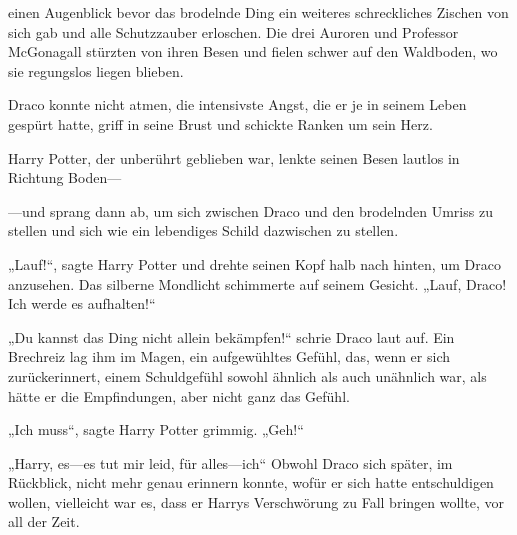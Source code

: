 \begin{em}
einen Augenblick bevor das brodelnde Ding ein weiteres schreckliches Zischen von sich gab und alle Schutzzauber erloschen. Die drei Auroren und Professor McGonagall stürzten von ihren Besen und fielen schwer auf den Waldboden, wo sie regungslos liegen blieben.

Draco konnte nicht atmen, die intensivste Angst, die er je in seinem Leben gespürt hatte, griff in seine Brust und schickte Ranken um sein Herz.

Harry Potter, der unberührt geblieben war, lenkte seinen Besen lautlos in Richtung Boden—

—und sprang dann ab, um sich zwischen Draco und den brodelnden Umriss zu stellen und sich wie ein lebendiges Schild dazwischen zu stellen.

„Lauf!“, sagte Harry Potter und drehte seinen Kopf halb nach hinten, um Draco anzusehen. Das silberne Mondlicht schimmerte auf seinem Gesicht. „Lauf, Draco! Ich werde es aufhalten!“

„Du kannst das Ding nicht allein bekämpfen!“ schrie Draco laut auf.
Ein Brechreiz lag ihm im Magen, ein aufgewühltes Gefühl, das, wenn er sich zurückerinnert, einem Schuldgefühl sowohl ähnlich als auch unähnlich war, als hätte er die Empfindungen, aber nicht ganz das Gefühl.

„Ich muss“, sagte Harry Potter grimmig. „Geh!“

„Harry, es—es tut mir leid, für alles—ich“
Obwohl Draco sich später, im Rückblick, nicht mehr genau erinnern konnte, wofür er sich hatte entschuldigen wollen, vielleicht war es, dass er Harrys Verschwörung zu Fall bringen wollte, vor all der Zeit.


\end{em}
